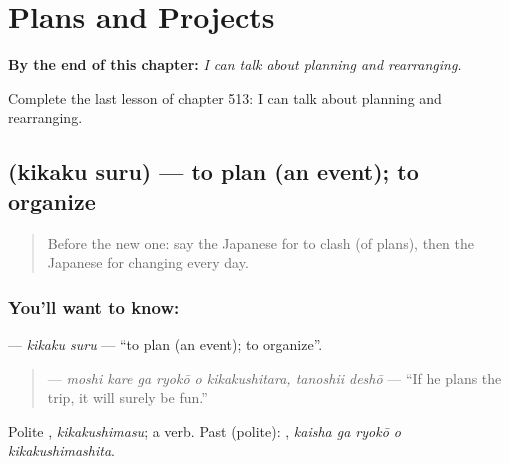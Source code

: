 
\chapter{Plans and Projects}
\label{ch:ja-plans-and-projects}

\begin{chapteropening}
\textbf{By the end of this chapter:} \emph{I can talk about planning and rearranging.}

Complete the last lesson of chapter 513: I can talk about planning and rearranging.
\end{chapteropening}

\section[\texorpdfstring{\ja{きかくする} (kikaku suru)}{きかくする (kikaku suru)}]{ (kikaku suru) — to plan (an event); to organize}

\label{lesson:JA-C513-kikaku-suru}



\begin{quote}
Before the new one: say the Japanese for to clash (of plans), then the Japanese for changing every day.
\end{quote}

\subsection*{You'll want to know: }
\textbf{} — \emph{kikaku suru} — \textquotedblleft{}to plan (an event); to organize\textquotedblright{}.

\begin{quote}
\textbf{   } — \emph{moshi kare ga ryokō o kikakushitara, tanoshii deshō} — \textquotedblleft{}If he plans the trip, it will surely be fun.\textquotedblright{}
\end{quote}

Polite \textbf{}, \emph{kikakushimasu}; a  verb. Past (polite): \textbf{  }, \emph{kaisha ga ryokō o kikakushimashita}.

